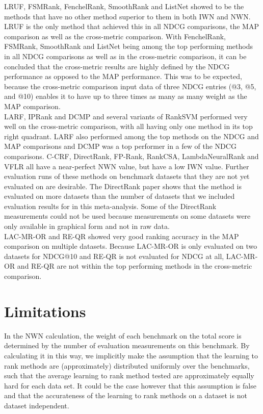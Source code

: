 \documentclass{sig-alternate}
\begin{document}
LRUF, FSMRank, FenchelRank, SmoothRank and ListNet showed to be the methods that have no other method superior to them in both IWN and NWN. LRUF is the only method that achieved this in all NDCG comparisons, the MAP comparison as well as the cross-metric comparison. With FenchelRank, FSMRank, SmoothRank and ListNet being among the top performing methods in all NDCG comparisons as well as in the cross-metric comparison, it can be concluded that the cross-metric results are highly defined by the NDCG performance as opposed to the MAP performance. This was to be expected, because the cross-metric comparison input data of three NDCG entries (@3, @5, and @10) enables it to have up to three times as many as many weight as the MAP comparison.\\

LARF, IPRank and DCMP and several variants of RankSVM performed very well on the cross-metric comparison, with all having only one method in its top right quadrant. LARF also performed among the top methods on the NDCG and MAP comparisons and DCMP was a top performer in a few of the NDCG comparisons. C-CRF, DirectRank, FP-Rank, RankCSA, LambdaNeuralRank and VFLR all have a near-perfect NWN value, but have a low IWN value. Further evaluation runs of these methods on benchmark datasets that they are not yet evaluated on are desirable. The DirectRank paper \cite{Tan2013} shows that the method  is evaluated on more datasets than the number of datasets that we included evaluation results for in this meta-analysis. Some of the DirectRank measurements could not be used because measurements on some datasets were only available in graphical form and not in raw data.\\

LAC-MR-OR and RE-QR showed very good ranking accuracy in the MAP comparison on multiple datasets. Because LAC-MR-OR is only evaluated on two datasets for NDCG@10 and RE-QR is not evaluated for NDCG at all, LAC-MR-OR and RE-QR are not within the top performing methods in the cross-metric comparison. 

\section{Limitations}
In the NWN calculation, the weight of each benchmark on the total score is determined by the number of evaluation measurements on this benchmark. By calculating it in this way, we implicitly make the assumption that the learning to rank methods are (approximately) distributed uniformly over the benchmarks, such that the average learning to rank method tested are approximately equally hard for each data set. It could be the case however that this assumption is false and that the accurateness of the learning to rank methods on a dataset is not dataset independent.\\
\end{document}
